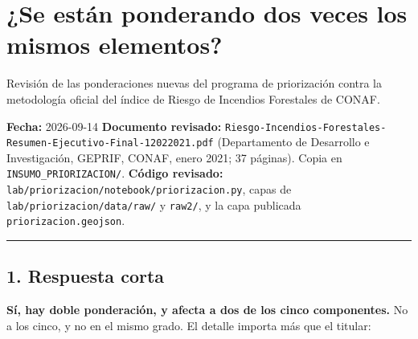 \documentclass[
  spanish,
  10pt,
]{article}
\author{}
\date{}
\begin{document}
{
\setcounter{tocdepth}{2}
\tableofcontents
}
\section{¿Se están ponderando dos veces los mismos
elementos?}\label{se-estuxe1n-ponderando-dos-veces-los-mismos-elementos}

Revisión de las ponderaciones nuevas del programa de priorización contra
la metodología oficial del índice de Riesgo de Incendios Forestales de
CONAF.

\textbf{Fecha:} 2026-09-14 \textbf{Documento revisado:}
\texttt{Riesgo-Incendios-Forestales-Resumen-Ejecutivo-Final-12022021.pdf}
(Departamento de Desarrollo e Investigación, GEPRIF, CONAF, enero 2021;
37 páginas). Copia en \texttt{INSUMO\_PRIORIZACION/}. \textbf{Código
revisado:} \texttt{lab/priorizacion/notebook/priorizacion.py}, capas de
\texttt{lab/priorizacion/data/raw/} y \texttt{raw2/}, y la capa
publicada \texttt{priorizacion.geojson}.

\begin{center}\rule{0.5\linewidth}{0.5pt}\end{center}

\subsection{1. Respuesta corta}\label{respuesta-corta}

\textbf{Sí, hay doble ponderación, y afecta a dos de los cinco
componentes.} No a los cinco, y no en el mismo grado. El detalle importa
más que el titular:
\end{document}
